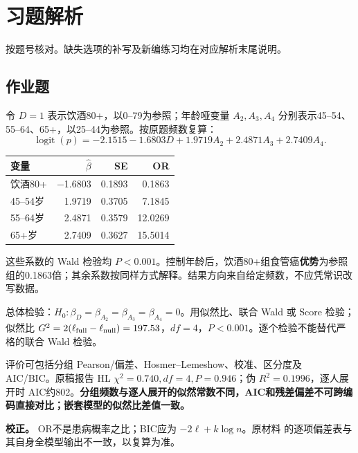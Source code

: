 \clearpage\section{习题解析}

\begin{keyidea}[核对方式]按题号核对。缺失选项的补写及新编练习均在对应解析末尾说明。\end{keyidea}

\subsection{作业题}


令 \(D=1\) 表示饮酒80+，以0--79为参照；年龄哑变量 \(A_2,A_3,A_4\) 分别表示45--54、55--64、65+，以25--44为参照。按原题频数复算： \[\operatorname{logit}(p)=-2.1515-1.6803D+1.9719A_2+2.4871A_3+2.7409A_4.\]

\begin{longtable}[]{@{}lrrr@{}}
\toprule\noalign{}
变量 & \(\hat\beta\) & SE & OR \\
\midrule\noalign{}
\endhead
\bottomrule\noalign{}
\endlastfoot
饮酒80+ & −1.6803 & 0.1893 & 0.1863 \\
45--54岁 & 1.9719 & 0.3705 & 7.1845 \\
55--64岁 & 2.4871 & 0.3579 & 12.0269 \\
65+岁 & 2.7409 & 0.3627 & 15.5014 \\
\end{longtable}

这些系数的 Wald 检验均 \(P<0.001\)。控制年龄后，饮酒80+组食管癌\textbf{优势}为参照组的0.1863倍；其余系数按同样方式解释。结果方向来自给定频数，不应凭常识改写数据。

总体检验：\(H_0:\beta_D=\beta_{A_2}=\beta_{A_3}=\beta_{A_4}=0\)。用似然比、联合 Wald 或 Score 检验；似然比 \(G^2=2(\ell_{\rm full}-\ell_{\rm null})=197.53\)，\(df=4\)，\(P<0.001\)。逐个检验不能替代严格的联合 Wald 检验。

评价可包括分组 Pearson/偏差、Hosmer--Lemeshow、校准、区分度及 AIC/BIC。原稿报告 HL \(\chi^2=0.740,df=4,P=0.946\)；伪 \(R^2=0.1996\)，逐人展开时 AIC约802。\textbf{分组频数与逐人展开的似然常数不同，AIC和残差偏差不可跨编码直接对比；嵌套模型的似然比差值一致。}

\textbf{校正。} OR不是患病概率之比；BIC应为 \(-2\ell+k\log n\)。原材料 的逐项偏差表与其自身全模型输出不一致，以复算为准。



